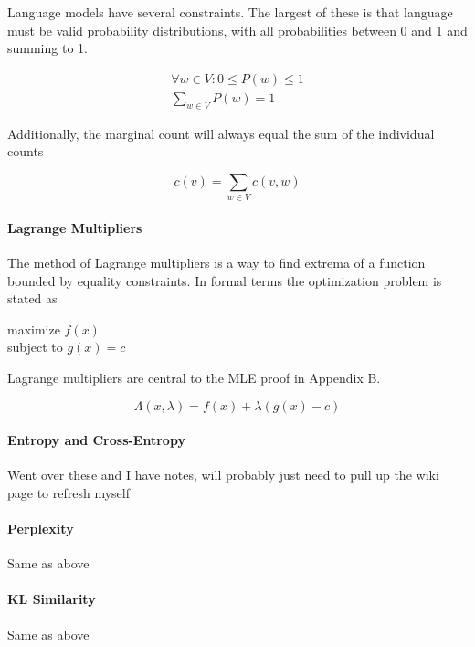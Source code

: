 \documentclass[11pt]{article}
\begin{document}
Language models have several constraints. The largest of these is that language must be valid probability distributions, with all probabilities between 0 and 1 and summing to 1.

\setcounter{equation}{0}

\begin{gather}
\forall w \in V : 0 \leq P\left(w\right) \leq 1 \\
\sum\limits_{w \in V} P\left(w\right) = 1
\end{gather}

Additionally, the marginal count will always equal the sum of the individual counts

$$ c\left(v\right) = \sum\limits_{w \in V} c\left(v, w\right) $$

\paragraph{Lagrange Multipliers}

The method of Lagrange multipliers is a way to find extrema of a function bounded by equality constraints. In formal terms the optimization problem is stated as

maximize $f\left(x\right)$ \\
subject to $g\left(x\right) = c$

Lagrange multipliers are central to the MLE proof in Appendix B.

$$ \Lambda\left(x, \lambda \right) = f\left(x\right) + \lambda\left(g\left(x\right) - c \right) $$

\paragraph{Entropy and Cross-Entropy}

{\color{red} Went over these and I have notes, will probably just need to pull up the wiki page to refresh myself}

\paragraph{Perplexity}

{\color{red} Same as above}

\paragraph{KL Similarity}

{\color{red} Same as above}
\end{document}
